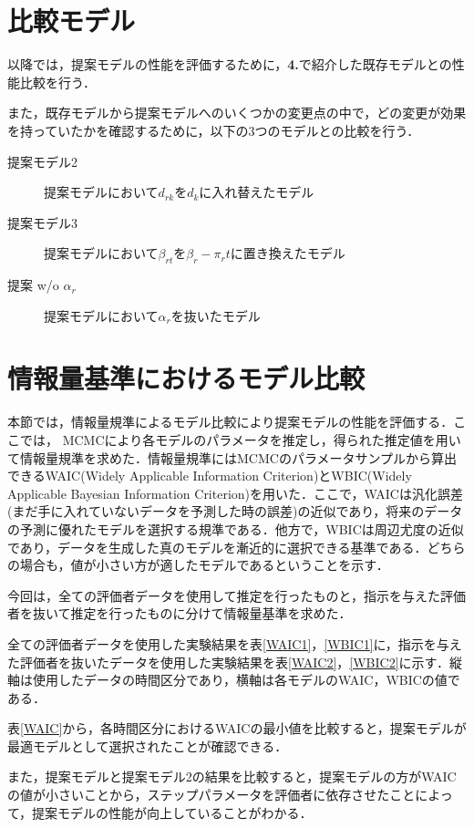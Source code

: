 \documentclass[a4paper,11pt,oneside,openany]{jsbook}
\begin{document}
\newpage
\section{比較モデル}
以降では，提案モデルの性能を評価するために，\textbf{4.}で紹介した既存モデルとの性能比較を行う．

また，既存モデルから提案モデルへのいくつかの変更点の中で，どの変更が効果を持っていたかを確認するために，以下の3つのモデルとの比較を行う．

\begin{description}
\item [提案モデル2]提案モデルにおいて$d_{rk}$を$d_k$に入れ替えたモデル
\item[提案モデル3]提案モデルにおいて$\beta_{rt}$を$\beta_{r} - \pi_{r}t$に置き換えたモデル
\item[提案 w/o $\alpha_r$]提案モデルにおいて$\alpha_r$を抜いたモデル
\end{description}

\section{情報量基準におけるモデル比較}

本節では，情報量規準によるモデル比較により提案モデルの性能を評価する．ここでは， MCMCにより各モデルのパラメータを推定し，得られた推定値を用いて情報量規準を求めた．情報量規準にはMCMCのパラメータサンプルから算出できるWAIC(Widely Applicable Information Criterion)とWBIC(Widely Applicable Bayesian Information Criterion)を用いた．ここで，WAICは汎化誤差(まだ手に入れていないデータを予測した時の誤差)の近似であり，将来のデータの予測に優れたモデルを選択する規準である．他方で，WBICは周辺尤度の近似であり，データを生成した真のモデルを漸近的に選択できる基準である．どちらの場合も，値が小さい方が適したモデルであるということを示す．

今回は，全ての評価者データを使用して推定を行ったものと，指示を与えた評価者を抜いて推定を行ったものに分けて情報量基準を求めた．

全ての評価者データを使用した実験結果を表\ref{WAIC1}，\ref{WBIC1}に，指示を与えた評価者を抜いたデータを使用した実験結果を表\ref{WAIC2}，\ref{WBIC2}に示す．縦軸は使用したデータの時間区分であり，横軸は各モデルのWAIC，WBICの値である．

表\ref{WAIC}から，各時間区分におけるWAICの最小値を比較すると，提案モデルが最適モデルとして選択されたことが確認できる．

また，提案モデルと提案モデル2の結果を比較すると，提案モデルの方がWAICの値が小さいことから，ステップパラメータを評価者に依存させたことによって，提案モデルの性能が向上していることがわかる．
\end{document}
